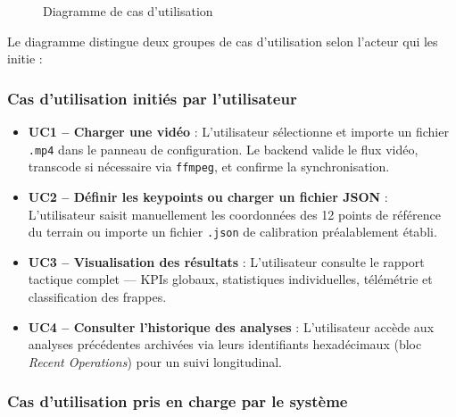 \begin{figure}[H]
    \centering
    \caption{Diagramme de cas d'utilisation}
    \label{fig:casdutilisation}
\end{figure}
 
Le diagramme distingue deux groupes de cas d'utilisation selon l'acteur qui les initie :
 
\subsubsection*{Cas d'utilisation initiés par l'utilisateur}
 
\begin{itemize}[leftmargin=1.5em]
  \item \textbf{UC1 – Charger une vidéo} : L'utilisateur sélectionne et importe un fichier
        \texttt{.mp4} dans le panneau de configuration. Le backend valide le flux vidéo,
        transcode si nécessaire via \texttt{ffmpeg}, et confirme la synchronisation.
 
  \item \textbf{UC2 – Définir les keypoints ou charger un fichier JSON} : L'utilisateur saisit
        manuellement les coordonnées des 12 points de référence du terrain ou importe un fichier
        \texttt{.json} de calibration préalablement établi.
 
  \item \textbf{UC3 – Visualisation des résultats} : L'utilisateur consulte le rapport tactique
        complet — KPIs globaux, statistiques individuelles, télémétrie et classification des
        frappes.
 
  \item \textbf{UC4 – Consulter l'historique des analyses} : L'utilisateur accède aux analyses
        précédentes archivées via leurs identifiants hexadécimaux (bloc \textit{Recent
        Operations}) pour un suivi longitudinal.
\end{itemize}
 
\subsubsection*{Cas d'utilisation pris en charge par le système}
 
